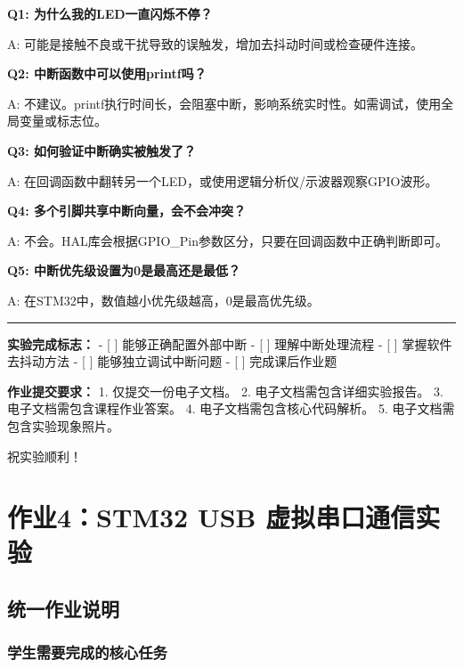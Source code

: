 \documentclass[
  chinese,
  UTF8,
  oneside,
  openany]{ctexbook}
\begin{document}
\textbf{Q1: 为什么我的LED一直闪烁不停？}

A: 可能是接触不良或干扰导致的误触发，增加去抖动时间或检查硬件连接。

\textbf{Q2: 中断函数中可以使用printf吗？}

A:
不建议。printf执行时间长，会阻塞中断，影响系统实时性。如需调试，使用全局变量或标志位。

\textbf{Q3: 如何验证中断确实被触发了？}

A: 在回调函数中翻转另一个LED，或使用逻辑分析仪/示波器观察GPIO波形。

\textbf{Q4: 多个引脚共享中断向量，会不会冲突？}

A: 不会。HAL库会根据GPIO\_Pin参数区分，只要在回调函数中正确判断即可。

\textbf{Q5: 中断优先级设置为0是最高还是最低？}

A: 在STM32中，数值越小优先级越高，0是最高优先级。

\begin{center}\rule{0.5\linewidth}{0.5pt}\end{center}

\textbf{实验完成标志：} - {[} {]} 能够正确配置外部中断 - {[} {]}
理解中断处理流程 - {[} {]} 掌握软件去抖动方法 - {[} {]}
能够独立调试中断问题 - {[} {]} 完成课后作业题

\textbf{作业提交要求：} 1. 仅提交一份电子文档。 2.
电子文档需包含详细实验报告。 3. 电子文档需包含课程作业答案。 4.
电子文档需包含核心代码解析。 5. 电子文档需包含实验现象照片。

祝实验顺利！

\chapter{作业4：STM32 USB
虚拟串口通信实验}\label{ux4f5cux4e1a4stm32-usb-ux865aux62dfux4e32ux53e3ux901aux4fe1ux5b9eux9a8c}

\section{统一作业说明}\label{ux7edfux4e00ux4f5cux4e1aux8bf4ux660e-3}

\subsection{学生需要完成的核心任务}\label{ux5b66ux751fux9700ux8981ux5b8cux6210ux7684ux6838ux5fc3ux4efbux52a1-3}
\end{document}
